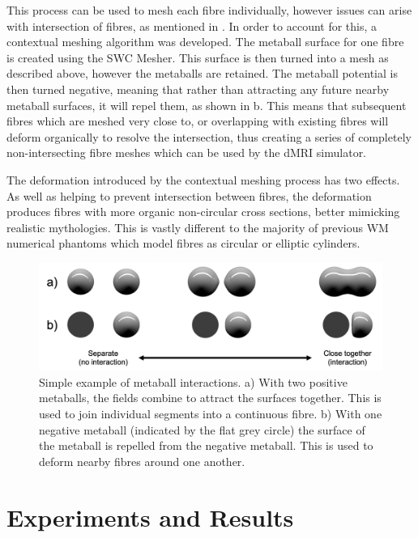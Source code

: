 This process can be used to mesh each fibre individually, however issues can arise with intersection of fibres, as mentioned in .
In order to account for this, a contextual meshing algorithm was developed.
The metaball surface for one fibre is created using the SWC Mesher.
This surface is then turned into a mesh as described above, however the metaballs are retained.
The metaball potential is then turned negative, meaning that rather than attracting any future nearby metaball surfaces, it will repel them, as shown in b.
This means that subsequent fibres which are meshed very close to, or overlapping with existing fibres will deform organically to resolve the intersection, thus creating a series of completely non-intersecting fibre meshes which can be used by the dMRI simulator.

The deformation introduced by the contextual meshing process has two effects.
As well as helping to prevent intersection between fibres, the deformation produces fibres with more organic non-circular cross sections, better mimicking realistic mythologies.
This is vastly different to the majority of previous WM numerical phantoms which model fibres as circular or elliptic cylinders.


\begin{figure}
  \centering
  \includegraphics[width=\textwidth]{figures/config/metaballs.png}
  \caption{\small Simple example of metaball interactions. a) With two positive metaballs, the fields combine to attract the surfaces together. This is used to join individual segments into a continuous fibre. b) With one negative metaball (indicated by the flat grey circle) the surface of the metaball is repelled from the negative metaball. This is used to deform nearby fibres around one another.}
  \label{fig:metaballs}
\end{figure}



\section{Experiments and Results}
\label{sec:experiments_and_results}


